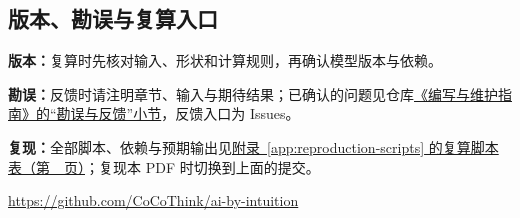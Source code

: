 \subsection{版本、勘误与复算入口}
\label{app:revision-notes}

\noindent\textbf{版本：}\bookbuildsource{}复算时先核对输入、形状和计算规则，再确认模型版本与依赖。\par
\noindent\textbf{勘误：}反馈时请注明章节、输入与期待结果；已确认的问题见仓库\href{https://github.com/CoCoThink/ai-by-intuition/blob/main/CONTRIBUTING.md\#\%E5\%8B\%98\%E8\%AF\%AF\%E4\%B8\%8E\%E5\%8F\%8D\%E9\%A6\%88}{《编写与维护指南》的“勘误与反馈”小节}，反馈入口为 Issues。\par
\noindent\textbf{复现：}全部脚本、依赖与预期输出见\hyperref[app:reproduction-scripts]{附录~\ref*{app:reproduction-scripts} 的复算脚本表（第~\pageref*{app:reproduction-scripts}~页）}；复现本 PDF 时切换到上面的提交。\par
\noindent\url{https://github.com/CoCoThink/ai-by-intuition}\par

